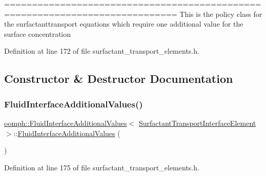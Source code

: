 ============================================================================= This is the policy class for the surfactanttransport equations which require one additional value for the surface concentration 

Definition at line 172 of file surfactant\+\_\+transport\+\_\+elements.\+h.



\subsection{Constructor \& Destructor Documentation}
\mbox{\label{classoomph_1_1FluidInterfaceAdditionalValues_3_01SurfactantTransportInterfaceElement_01_4_aff7c8643ad9a5c817d99afa3dc48f701}} 
\subsubsection{\texorpdfstring{Fluid\+Interface\+Additional\+Values()}{FluidInterfaceAdditionalValues()}}
{\footnotesize\ttfamily \hyperlink{classoomph_1_1FluidInterfaceAdditionalValues}{oomph\+::\+Fluid\+Interface\+Additional\+Values}$<$ \hyperlink{classoomph_1_1SurfactantTransportInterfaceElement}{Surfactant\+Transport\+Interface\+Element} $>$\+::\hyperlink{classoomph_1_1FluidInterfaceAdditionalValues}{Fluid\+Interface\+Additional\+Values} (\begin{DoxyParamCaption}{ }\end{DoxyParamCaption})\hspace{0.3cm}{\ttfamily [inline]}}



Definition at line 175 of file surfactant\+\_\+transport\+\_\+elements.\+h.



